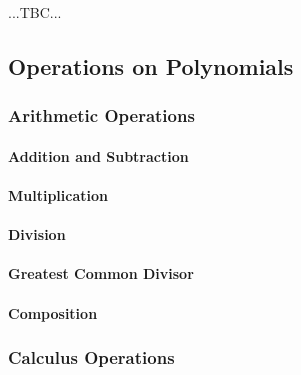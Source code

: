 ...TBC...


\subsection{Operations on Polynomials}

\subsubsection{Arithmetic Operations}

\paragraph{Addition and Subtraction}

\paragraph{Multiplication}

\paragraph{Division}

\paragraph{Greatest Common Divisor}




\paragraph{Composition}

\subsubsection{Calculus Operations}

